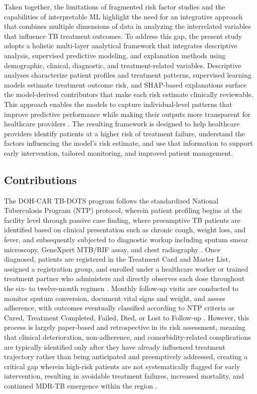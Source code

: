 \documentclass[12pt]{article}
\begin{document}
Taken together, the limitations of fragmented risk factor studies and the capabilities of interpretable ML highlight the need for an integrative approach that combines multiple dimensions of data in analyzing the interrelated variables that influence TB treatment outcomes. To address this gap, the present study adopts a holistic multi-layer analytical framework that integrates descriptive analysis, supervised predictive modeling, and explanation methods using demographic, clinical, diagnostic, and treatment-related variables. Descriptive analyses characterize patient profiles and treatment patterns, supervised learning models estimate treatment outcome risk, and SHAP-based explanations surface the model-derived contributors that make each risk estimate clinically reviewable. This approach enables the models to capture individual-level patterns that improve predictive performance while making their outputs more transparent for healthcare providers \citep{ref23, ref24}. The resulting framework is designed to help healthcare providers identify patients at a higher risk of treatment failure, understand the factors influencing the model's risk estimate, and use that information to support early intervention, tailored monitoring, and improved patient management.

\subsection{Contributions}

The DOH-CAR TB-DOTS program follows the standardized National Tuberculosis Program (NTP) protocol, wherein patient profiling begins at the facility level through passive case finding, where presumptive TB patients are identified based on clinical presentation such as chronic cough, weight loss, and fever, and subsequently subjected to diagnostic workup including sputum smear microscopy, GeneXpert MTB/RIF assay, and chest radiography \citep{ref5, ref6}. Once diagnosed, patients are registered in the Treatment Card and Master List, assigned a registration group, and enrolled under a healthcare worker or trained treatment partner who administers and directly observes each dose throughout the six- to twelve-month regimen \citep{ref6}. Monthly follow-up visits are conducted to monitor sputum conversion, document vital signs and weight, and assess adherence, with outcomes eventually classified according to NTP criteria as Cured, Treatment Completed, Failed, Died, or Lost to Follow-up \citep{ref19}. However, this process is largely paper-based and retrospective in its risk assessment, meaning that clinical deterioration, non-adherence, and comorbidity-related complications are typically identified only after they have already influenced treatment trajectory rather than being anticipated and preemptively addressed, creating a critical gap wherein high-risk patients are not systematically flagged for early intervention, resulting in avoidable treatment failures, increased mortality, and continued MDR-TB emergence within the region \citep{ref28, ref30}.
\end{document}
